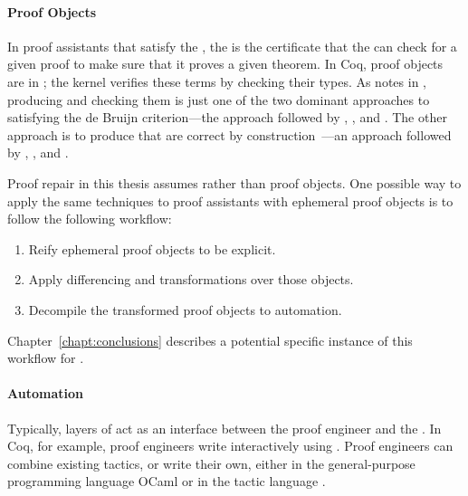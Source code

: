 \paragraph{Proof Objects} 
In proof assistants that satisfy the , the  is the certificate that the  can check for
a given proof to make sure that it proves a given theorem.
In Coq, proof objects are  in ; the kernel verifies these terms by checking their types.
As  notes in , producing  and checking them is just one of the two dominant approaches to satisfying 
the de Bruijn criterion---the approach followed by , , and .
The other approach is to produce  that are correct by construction~\cite{Barendregt2013}---an approach followed
by , , and . %

Proof repair in this thesis assumes  rather than  proof objects.
One possible way to apply the same techniques to proof assistants with ephemeral proof objects is to follow the following workflow:

\begin{enumerate}
\item Reify ephemeral proof objects to be explicit.
\item Apply differencing and transformations over those objects.
\item Decompile the transformed proof objects to automation.
\end{enumerate}
Chapter~\ref{chapt:conclusions} describes a potential specific instance of this workflow for .

\paragraph{Automation} %
Typically, layers of  act as an interface between the proof engineer and the .
In Coq, for example, proof engineers write  interactively using .
Proof engineers can combine existing tactics, or write their own, either in the general-purpose programming language
OCaml or in the tactic language . 

